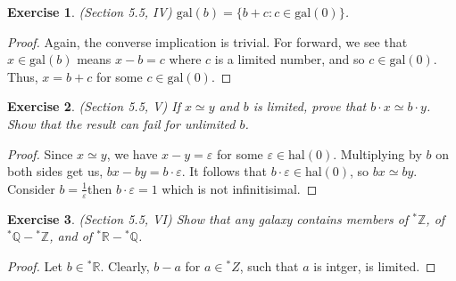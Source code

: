 \documentclass[a4paper, 11pt, openany]{book}
\theoremstyle{plain}
\newtheorem{exercise}{Exercise}[chapter]
\theoremstyle{plain}
\newcommand{\Z}{\mathbb{Z}}
\newcommand{\Q}{\mathbb{Q}}
\newcommand{\R}{\mathbb{R}}
\newcommand{\ep}{\varepsilon}
\newcommand{\hyp}{{}^*}
\newcommand{\hal}{\text{hal}}
\newcommand{\gal}{\text{gal}}
\begin{document}
  \begin{exercise}
    (Section 5.5, IV)
    $\gal(b)=\{b+c: c\in \gal (0) \}$.
  \end{exercise}
  \begin{proof}
    Again, the converse implication is trivial. For forward, we see that $x \in \gal(b)$ means $x-b=c$ where $c$ is a limited number, and so $c \in \gal(0)$. Thus, $x=b+c$ for some $c \in \gal(0)$.
  \end{proof}
  
  \begin{exercise}
    (Section 5.5, V)
    If $x \simeq y$ and $b$ is limited, prove that $b \cdot x \simeq b \cdot y$. Show that the result can fail for unlimited $b$. 
  \end{exercise}
  \begin{proof}
    Since $x \simeq y$, we have $x-y=\ep$ for some $\ep \in \hal(0)$. Multiplying by $b$ on both sides get us, $bx-by=b \cdot \ep$. It follows that $b \cdot \ep \in \hal(0)$, so $bx \simeq by$. Consider $b=\frac{1}{\ep}$then $b \cdot \ep=1$ which is not infinitisimal.
  \end{proof}

  \begin{exercise}
    (Section 5.5, VI)
    Show that any galaxy contains members of $\hyp \Z$, of $\hyp \Q - \hyp \Z$, and of $\hyp \R - \hyp \Q$.
  \end{exercise}
  \begin{proof}
    Let $b \in \hyp \R$. Clearly, $b-a$ for $a \in \hyp Z$, such that $a$ is intger, is limited. 
  \end{proof}
\end{document}
